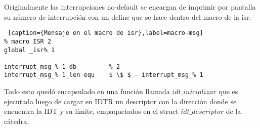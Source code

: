 Originalmente las interrupciones no-default se encargan de imprimir por pantalla su número de interrupción con un define que se hace dentro del macro de la isr.
\begin{lstlisting} [caption={Mensaje en el macro de isr},label=macro-msg]
% macro ISR 2
global _isr% 1

interrupt_msg_% 1 db         % 2
interrupt_msg_% 1_len equ    $ \$ $ - interrupt_msg_% 1

\end{lstlisting}

Todo esto quedó encapsulado en una función llamada $idt\_inicializar$ que es ejecutada luego de cargar en IDTR un descriptor con la dirección donde se encuentra la IDT y su límite, empaquetados en el struct $idt\_descriptor$ de la cátedra.

